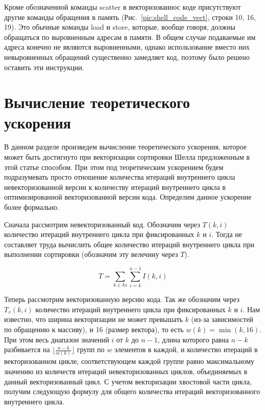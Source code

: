 \documentclass[utf8]{psta}
\begin{document}
Кроме обозначенной команды scatter в векторизованнос коде присутствуют другие команды обращения в память (Рис.~\ref{pic:shell_code_vect}, строки 10, 16, 19). Это обычные команды load и store, которые, вообще говоря, должны обращаться по выровненным адресам в памяти. В общем случае подаваемые им адреса конечно не являются выровненными, однако использование вместо них невыровненных обращений существенно замедляет код, поэтому было решено оставить эти инструкции.

\section{Вычисление теоретического ускорения}

В данном разделе произведем вычисление теоретического ускорения, которое может быть достигнуто при векторизации сортировки Шелла предложенным в этой статье способом. При этом под теоретическим ускорением будем подразумевать просто отношение количества итераций внутреннего цикла невекторизованной версии к количеству итераций внутреннего цикла в оптимизированной векторизованной версии кода. Определим данное ускорение более формально.

Сначала рассмотрим невекторизованный код. Обозначим через $T(k, i)$ количество итераций внутреннего цикла при фиксированных $k$ и $i$. Тогда не составляет труда вычислить общее количество итераций внутреннего цикла при выполнении сортировки (обозначим эту велечину через $T$).

\begin{equation}
T = \sum_{k \in ks}{\sum_{i = k}^{n - 1}{I(k, i)}}
\end{equation}

Теперь рассмотрим векторизованную версию кода. Так же обозначим через $T_v(k,i)$ количество итераций внутреннего цикла при фиксированных $k$ и $i$. Нам известно, что ширина векторизации не может превышать $k$ (из-за зависимостей по обращению к массиву), и 16 (размер вектора), то есть $w(k) = \min(k, 16)$. При этом весь диапазон значений $i$ от $k$ до $n - 1$, длина которого равна $n - k$ разбивается на $\lfloor \frac{n - k}{w(k)} \rfloor$ групп по $w$ элементов в каждой, и количество итераций в векторизованном цикле, соответствующем каждой группе равно максимальному значению из количеств итераций невекторизованных циклов, объединяемых в данный векторизованный цикл. С учетом векторизации хвостовой части цикла, получим следующую формулу для общего количества итераций векторизованного внутреннего цикла.
\end{document}
